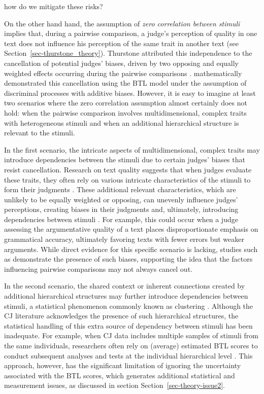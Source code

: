 \documentclass[
  authoryear,
  preprint,
  1p]{elsarticle}
\begin{document}
{how do we mitigate these risks?}

On the other hand hand, the assumption of \emph{zero correlation between
stimuli} implies that, during a pairwise comparison, a judge's
perception of quality in one text does not influence his perception of
the same trait in another text (see Section~\ref{sec-thurstone_theory}).
Thurstone attributed this independence to the cancellation of potential
judges' biases, driven by two opposing and equally weighted effects
occurring during the pairwise comparisons
\citep[pp.~268]{Thurstone_1927b}. \citet{Andrich_1978} mathematically
demonstrated this cancellation using the BTL model under the assumption
of discriminal processes with additive biases. However, it is easy to
imagine at least two scenarios where the zero correlation assumption
almost certainly does not hold: when the pairwise comparison involves
multidimensional, complex traits with heterogeneous stimuli and when an
additional hierarchical structure is relevant to the stimuli.

In the first scenario, the intricate aspects of multidimensional,
complex traits may introduce dependencies between the stimuli due to
certain judges' biases that resist cancellation. Research on text
quality suggests that when judges evaluate these traits, they often rely
on various intricate characteristics of the stimuli to form their
judgments
\citep{vanDaal_et_al_2016, Lesterhuis_2018, Chambers_et_al_2022}. These
additional relevant characteristics, which are unlikely to be equally
weighted or opposing, can unevenly influence judges' perceptions,
creating biases in their judgments and, ultimately, introducing
dependencies between stimuli
\citep[pp.~346]{vanderLinden_et_al_2017_II}. For example, this could
occur when a judge assessing the argumentative quality of a text places
disproportionate emphasis on grammatical accuracy, ultimately favoring
texts with fewer errors but weaker arguments. While direct evidence for
this specific scenario is lacking, studies such as
\citet{Pollitt_et_al_2003} demonstrate the presence of such biases,
supporting the idea that the factors influencing pairwise comparisons
may not always cancel out.

In the second scenario, the shared context or inherent connections
created by additional hierarchical structures may further introduce
dependencies between stimuli, a statistical phenomenon commonly known as
clustering \citep{Everitt_et_al_2010}. Although the CJ literature
acknowledges the presence of such hierarchical structures, the
statistical handling of this extra source of dependency between stimuli
has been inadequate. For example, when CJ data includes multiple samples
of stimuli from the same individuals, researchers often rely on
(average) estimated BTL scores to conduct subsequent analyses and tests
at the individual hierarchical level
\citep{Bramley_et_al_2019, Boonen_et_al_2020, Bouwer_et_al_2023, vanDaal_et_al_2017, Jones_et_al_2019, Gijsen_et_al_2021}.
This approach, however, has the significant limitation of ignoring the
uncertainty associated with the BTL scores, which generates additional
statistical and measurement issues, as discussed in section
Section~\ref{sec-theory-issue2}.
\end{document}
